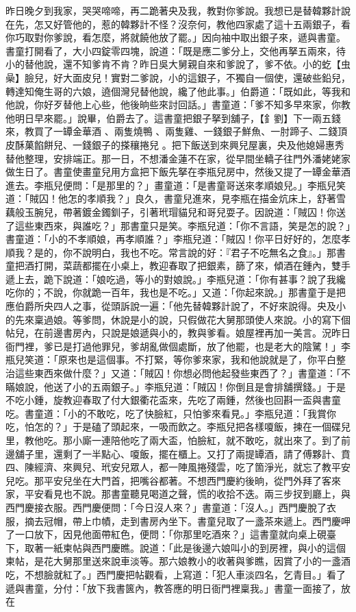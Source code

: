 \begin{showcontents}{}
昨日晚夕到我家，哭哭啼啼，再二跪著央及我，教對你爹說。我想已是替韓夥計說在先，怎又好管他的，惹的韓夥計不怪？沒奈何，教他四家處了這十五兩銀子，看你巧取對你爹說，看怎麼，將就饒他放了罷。」因向袖中取出銀子來，遞與書童。書童打開看了，大小四錠零四塊，說道：「既是應二爹分上，交他再拏五兩來，待小的替他說，還不知爹肯不肯？昨日吳大舅親自來和爹說了，爹不依。小的虼【虫喿】臉兒，好大面皮兒！實對二爹說，小的這銀子，不獨自一個使，還破些鉛兒，轉達知俺生哥的六娘，遶個灣兒替他說，纔了他此事。」伯爵道：「既如此，等我和他說，你好歹替他上心些，他後晌些來討回話。」書童道：「爹不知多早來家，你教他明日早來罷。」說畢，伯爵去了。這書童把銀子拏到舖子，【釒劉】下一兩五錢來，教買了一罈金華酒 、兩隻燒鴨 、兩隻雞、一錢銀子鮮魚、一肘蹄子、二錢頂皮酥菓餡餅兒、一錢銀子的搽穰捲兒 。把下飯送到來興兒屋裏，央及他媳婦惠秀替他整理，安排端正。那一日，不想潘金蓮不在家，從早間坐轎子往門外潘姥姥家做生日了。書童使畫童兒用方盒把下飯先拏在李瓶兒房中，然後又提了一罈金華酒 進去。李瓶兒便問：「是那里的？」畫童道：「是書童哥送來孝順娘兒。」李瓶兒笑道：「賊囚！他怎的孝順我？」良久，書童兒進來，見李瓶在描金炕床上，舒著雪藕般玉腕兒，帶著鍍金鐲釧子，引著玳瑁貓兒和哥兒耍子。因說道：「賊囚！你送了這些東西來，與誰吃？」那書童只是笑。李瓶兒道：「你不言語，笑是怎的說？」書童道：「小的不孝順娘，再孝順誰？」李瓶兒道：「賊囚！你平日好好的，怎麼孝順我？是的，你不說明白，我也不吃。常言說的好：『君子不吃無名之食』。」那書童把酒打開，菜蔬都擺在小桌上，教迎春取了把銀素，篩了來，傾酒在鍾內，雙手遞上去，跪下說道：「娘吃過，等小的對娘說。」李瓶兒道：「你有甚事？說了我纔吃你的；不說，你就跪一百年，我也是不吃。」又道：「你起來說。」那書童于是把應伯爵所央四人之事，從頭訴說一遍：「他先替韓夥計說了，不好來說得。央及小的先來稟過娘。等爹問，休說是小的說，只假做花大舅那頭使人來說。小的寫下個帖兒，在前邊書房內，只說是娘遞與小的，教與爹看。娘屋裡再加一美言。況昨日衙門裡，爹已是打過他罪兒，爹胡亂做個處斷，放了他罷，也是老大的陰騭！」李瓶兒笑道：「原來也是這個事。不打緊，等你爹來家，我和他說就是了，你平白整治這些東西來做什麼？」又道：「賊囚！你想必問他起發些東西了？」書童道：「不瞞娘說，他送了小的五兩銀子。」李瓶兒道：「賊囚！你倒且是會排舖撰錢。」于是不吃小鍾，旋教迎春取了付大銀衢花盃來，先吃了兩鍾，然後也回斟一盃與書童吃。書童道：「小的不敢吃，吃了快臉紅，只怕爹來看見。」李瓶兒道：「我賞你吃，怕怎的？」于是磕了頭起來，一吸而飲之。李瓶兒把各樣嗄飯，揀在一個碟兒里，教他吃。那小廝一連陪他吃了兩大盃，怕臉紅，就不敢吃，就出來了。到了前邊舖子里，還剩了一半點心、嗄飯，擺在櫃上。又打了兩提罈酒，請了傅夥計、賁四、陳經濟、來興兒、玳安兒眾人，都一陣風捲殘雲，吃了箇淨光，就忘了教平安兒吃。那平安兒坐在大門首，把嘴谷都著。不想西門慶約後晌，從門外拜了客來家，平安看見也不說。那書童聽見喝道之聲，慌的收拾不迭。兩三步扠到廳上，與西門慶接衣服。西門慶便問：「今日沒人來？」書童道：「沒人。」西門慶脫了衣服，摘去冠帽，帶上巾幘，走到書房內坐下。書童兒取了一盞茶來遞上。西門慶呷了一口放下，因見他面帶紅色，便問：「你那里吃酒來？」這書童就向桌上硯臺下，取著一紙柬帖與西門慶瞧。說道：「此是後邊六娘叫小的到房裡，與小的這個柬帖，是花大舅那里送來說車淡等。那六娘教小的收著與爹瞧，因賞了小的一盞酒吃，不想臉就紅了。」西門慶把帖觀看，上寫道：「犯人車淡四名，乞青目。」看了遞與書童，分付：「放下我書篋內，教答應的明日衙門裡稟我。」書童一面接了，放在
\end{showcontents}
